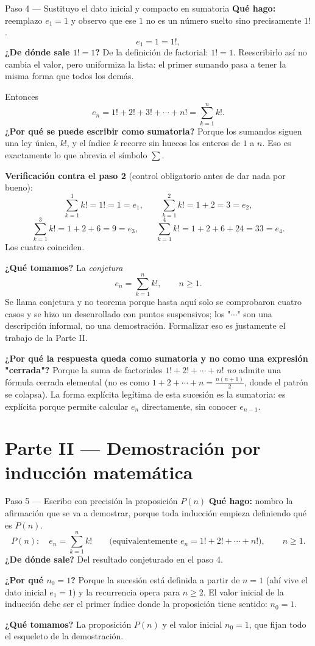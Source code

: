 \documentclass[11pt]{article}
\begin{document}
\begin{paso}{Paso 4 --- Sustituyo el dato inicial y compacto en sumatoria}
\textbf{Qué hago:} reemplazo $e_1=1$ y observo que ese $1$ no es un número suelto sino precisamente $1!$.
\[
e_1 = 1 = 1! ,
\]
\textbf{¿De dónde sale $1!=1$?} De la definición de factorial: $1!=1$. Reescribirlo así no cambia el valor, pero uniformiza la lista: el primer sumando pasa a tener la misma forma que todos los demás.

Entonces
\[
e_n = 1! + 2! + 3! + \cdots + n! = \sum_{k=1}^{n} k! .
\]
\textbf{¿Por qué se puede escribir como sumatoria?} Porque los sumandos siguen una ley única, $k!$, y el índice $k$ recorre sin huecos los enteros de $1$ a $n$. Eso es exactamente lo que abrevia el símbolo $\sum$.

\textbf{Verificación contra el paso 2} (control obligatorio antes de dar nada por bueno):
\[
\sum_{k=1}^{1}k! = 1!=1=e_1,\qquad
\sum_{k=1}^{2}k! = 1+2=3=e_2,
\]
\[
\sum_{k=1}^{3}k! = 1+2+6=9=e_3,\qquad
\sum_{k=1}^{4}k! = 1+2+6+24=33=e_4 .
\]
Los cuatro coinciden.

\textbf{¿Qué tomamos?} La \emph{conjetura}
\[
e_n=\sum_{k=1}^{n}k!,\qquad n\ge 1 .
\]
Se llama conjetura y no teorema porque hasta aquí solo se comprobaron cuatro casos y se hizo un desenrollado con puntos suspensivos; los "$\cdots$" son una descripción informal, no una demostración. Formalizar eso es justamente el trabajo de la Parte II.
\end{paso}

\begin{nota}
\textbf{¿Por qué la respuesta queda como sumatoria y no como una expresión "cerrada"?} Porque la suma de factoriales $1!+2!+\cdots+n!$ \emph{no} admite una fórmula cerrada elemental (no es como $1+2+\cdots+n=\frac{n(n+1)}{2}$, donde el patrón se colapsa). La forma explícita legítima de esta sucesión es la sumatoria: es explícita porque permite calcular $e_n$ directamente, sin conocer $e_{n-1}$.
\end{nota}

\newpage
\section*{Parte II --- Demostración por inducción matemática}

\begin{paso}{Paso 5 --- Escribo con precisión la proposición $P(n)$}
\textbf{Qué hago:} nombro la afirmación que se va a demostrar, porque toda inducción empieza definiendo qué es $P(n)$.
\[
P(n):\quad e_n=\sum_{k=1}^{n}k! \qquad\text{(equivalentemente } e_n = 1!+2!+\cdots+n!\text{)},\qquad n\ge 1 .
\]
\textbf{¿De dónde sale?} Del resultado conjeturado en el paso 4.

\textbf{¿Por qué $n_0=1$?} Porque la sucesión está definida a partir de $n=1$ (ahí vive el dato inicial $e_1=1$) y la recurrencia opera para $n\ge2$. El valor inicial de la inducción debe ser el primer índice donde la proposición tiene sentido: $n_0=1$.

\textbf{¿Qué tomamos?} La proposición $P(n)$ y el valor inicial $n_0=1$, que fijan todo el esqueleto de la demostración.
\end{paso}
\end{document}
